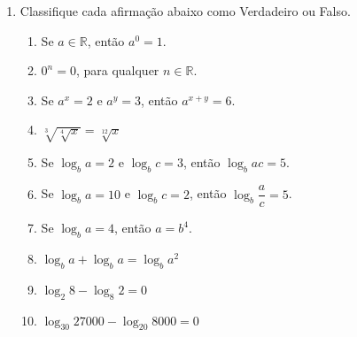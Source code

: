 \documentclass[12pt,a4paper]{article}
\begin{document}
\begin{enumerate}
  \item Classifique cada afirmação abaixo como Verdadeiro ou Falso.
    \begin{enumerate}[(\ \ )]
      \item Se $a\in \mathbb{R}$, então $a^0 = 1$.
      \item $0^n = 0$, para qualquer $n\in \mathbb{R}$.
      \item Se $a^x = 2$ e $a^y = 3$, então $a^{x + y} = 6$.
      \item $\sqrt[3]{\sqrt[4]{x}} = \sqrt[12]{x}$
      \item Se $\log_b a = 2$ e $\log_b c = 3$, então $\log_b ac = 5$.
      \item Se $\log_b a = 10$ e $\log_b c = 2$, então $\log_b \dfrac{a}{c} = 5$.
      \item Se $\log_b a = 4$, então $a = b^4$.
      \item $\log_b a + \log_b a = \log_b a^2$
      \item $\log_2 8 - \log_8 2 = 0$
      \item $\log_{30} 27000 - \log_{20} 8000 = 0$
    \end{enumerate}

\end{enumerate}
\end{document}
